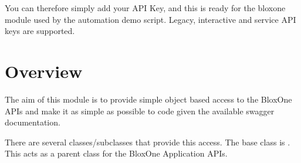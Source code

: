 \documentclass[letterpaper,10pt,english]{sphinxmanual}
\begin{document}
\begin{sphinxVerbatim}[commandchars=\\\{\}]
\PYG{p}{[}\PYG{p}{]}
  
  
  
\end{sphinxVerbatim}

\sphinxAtStartPar
You can therefore simply add your API Key, and this is ready for the bloxone
module used by the automation demo script. Legacy, interactive and service API
keys are supported.


\section{Overview}
\label{\detokenize{usage:overview}}
\sphinxAtStartPar
The aim of this module is to provide simple object based access to the
BloxOne APIs and make it as simple as possible to code given the available
swagger documentation.

\sphinxAtStartPar
There are several classes/subclasses that provide this access. The base
class is . This acts as a parent class for the BloxOne Application
APIs.
\end{document}
